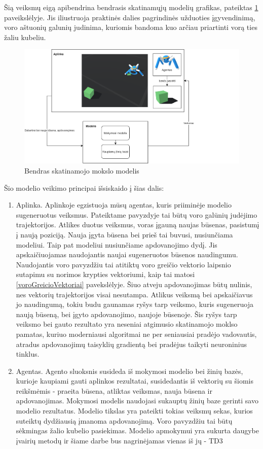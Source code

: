 \documentclass[a4paper, 12pt]{article}
\begin{document}
Šią veiksmų eigą apibendrina bendrasis skatinamųjų modelių grafikas, pateiktas \ref{RLmodel} paveikslėlyje. Jis iliustruoja praktinės dalies pagrindinės užduoties įgyvendinimą, voro aštuonių galunių judinima, kuriomis bandoma kuo arčiau priartinti vorą ties žaliu kubeliu. 
\clearpage

\begin{figure}[h]
\centering
\includegraphics[width=1.3\textwidth]{RLmodel}
\caption{Bendras skatinamojo mokslo modelis}
\label{RLmodel}
\end{figure}



Šio modelio veikimo principai išsiskaido į šias dalis:
\begin{enumerate}
  \addtolength{\itemsep}{-0.5\baselineskip} 
  \item Aplinka. Aplinkoje egzistuoja mūsų agentas, kuris priiminėje modelio sugeneruotus veiksmus. Pateiktame pavyzdyje tai būtų voro galūnių judėjimo trajektorijos. Atlikes duotus veiksmus, voras įgauną naujas būsenas, pasistumį į naują poziciją. Nauja įgyta būsena bei prieš tai buvusi, nusiunčiama modeliui. Taip pat modeliui nusiunčiame apdovanojimo dydį. Jis apskaičiuojamas naudojantis naujai sugeneruotos būsenos naudingumu. Naudojantis voro pavyzdžiu tai atitiktų voro greičio vektorio laipsnio sutapimu su norimos krypties vektoriumi, kaip tai matosi \ref{voroGreicioVektoriai} pavekslėlyje. Šiuo atveju apdovanojimas būtų nulinis, nes vektorių trajektorijos visai nesutampa. Atlikus veiksmą bei apskaičiavus jo naudingumą, tokiu budu gaunamas ryšys tarp veiksmo, kuris sugeneruoja naują būseną, bei įgyto apdovanojimo, naujoje būsenoje. Šis ryšys tarp veiksmo bei gauto rezultato yra neseniai atgimusio skatinamojo moklso pamatas, kuriuo moderniausi algoritmai ne per seniausiai pradėjo vadovautis, atradus apdovanojimų taisyklių gradientą bei pradėjus taikyti neuroninius tinklus. 
  \item Agentas. Agento sluoksnis susideda iš mokymosi modelio bei žinių bazės, kurioje kaupiami gauti aplinkos rezultatai, susidedantis iš vektorių su šiomis reikšmėmis - praeita būsena, atliktas veiksmas, nauja būsena ir apdovanojimas. Mokymosi modelis naudojasi sukauptų žinių baze gerinti savo modelio rezultatus. Modelio tikslas yra pateikti tokias veiksmų sekas, kurios suteiktų dydžiausią įmanoma apdovanojimą. Voro pavyzdžiu tai būtų sėkmingas žalio kubelio pasiekimas. Modelio apmokymui yra sukurta daugybe įvairių metodų ir šiame darbe bus nagrinėjamas vienas iš jų - TD3
\end{enumerate}
\end{document}
